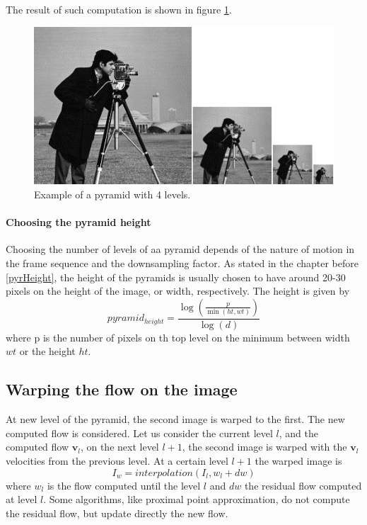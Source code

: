 \documentclass[12pt,a4paper,twoside]{report}
\begin{document}
The result of such computation is shown in figure \ref{cameraPyr}.

\begin{figure}
	\label{cameraPyr}
	\centering
	\includegraphics{img/cameraman}
	\caption{Example of a pyramid with 4 levels.}
\end{figure}


\paragraph{Choosing the pyramid height} 
Choosing the number of levels of aa pyramid depends of the nature of motion in the frame sequence and the downsampling factor.
 As stated in the chapter before \ref{pyrHeight}, the height of the pyramids is usually chosen to have around 20-30 pixels on the height of the image, or width, respectively. The height is given by
\begin{equation}
	pyramid_{height} = \frac{\log\left(\frac{p}{\min(ht,wt)}\right)}
							{\log(d)}
\end{equation}
where p is the number of pixels on th top level on the minimum between  width $wt$ or the height $ht$.
\subsection{Warping the flow on the image}


At new level of the pyramid, the second image is warped to the first.
The new computed flow is considered.
Let us consider the current level $l$, and the computed flow $\boldsymbol{v}_l$, on the next level $l+1$, the second image is warped with the $\boldsymbol{v}_l$ velocities from the previous level.
At a certain level $l+1$ the warped image is 
\begin{equation}
I_w = interpolation(I_l, w_l+dw)
\end{equation}
where $w_l$ is the flow computed until the level $l$ and $dw$ the  residual flow computed at level $l$. Some algorithms, like proximal point approximation, do not compute the residual flow, but update directly the new flow.
\end{document}
